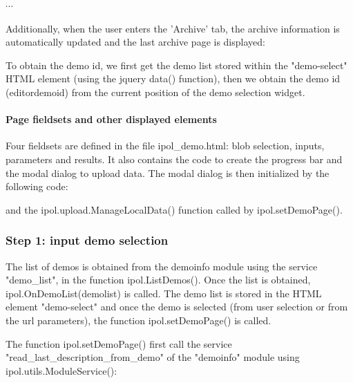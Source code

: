 
$\cdots$


Additionally, when the user enters the 'Archive' tab, the archive information
is automatically updated and the last archive page is displayed:

To obtain the demo id, we first get the demo list stored within the "demo-select"
HTML element (using the jquery data() function), then we obtain the demo id 
(editordemoid) from the current position of the demo selection widget.

\paragraph{Page fieldsets and other displayed elements}

Four fieldsets are defined in the file ipol\_demo.html: blob selection, inputs, 
parameters and results. It also contains the code to create the progress bar
and the modal dialog to upload data.
The modal dialog is then initialized by the following code:

and the ipol.upload.ManageLocalData() function called by ipol.setDemoPage().

\subsubsection{Step 1: input demo selection}

The list of demos is obtained from the demoinfo module using the service "demo\_list",
in the function ipol.ListDemos(). Once the list is obtained, 
ipol.OnDemoList(demolist) is called.
The demo list is stored in the HTML element "demo-select" and once the demo is
selected (from user selection or from the url parameters), the function 
ipol.setDemoPage() is called.

The function ipol.setDemoPage() first call the service "read\_last\-\_des\-crip\-tion\_from\_demo"
of the "demoinfo" module using ipol.utils.ModuleService():



